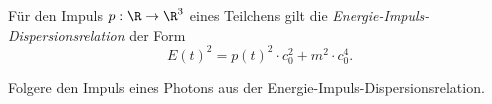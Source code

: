 \documentclass[../WiSe22ANA3.tex]{subfiles}
\begin{document}
		\begin{info}
			Für den Impuls $p:\R\to\R^3$ eines Teilchens gilt die \emph{Energie-Impuls-Dispersionsrelation} der Form 
			$$E(t)^2=p(t)^2\cdot c_0^2+m^2\cdot c_0^4.$$
		\end{info}
		\begin{Aufgabe}
			\nr Folgere den Impuls eines Photons aus der Energie-Impuls-Dispersionsrelation. 
		\end{Aufgabe}
\end{document}
